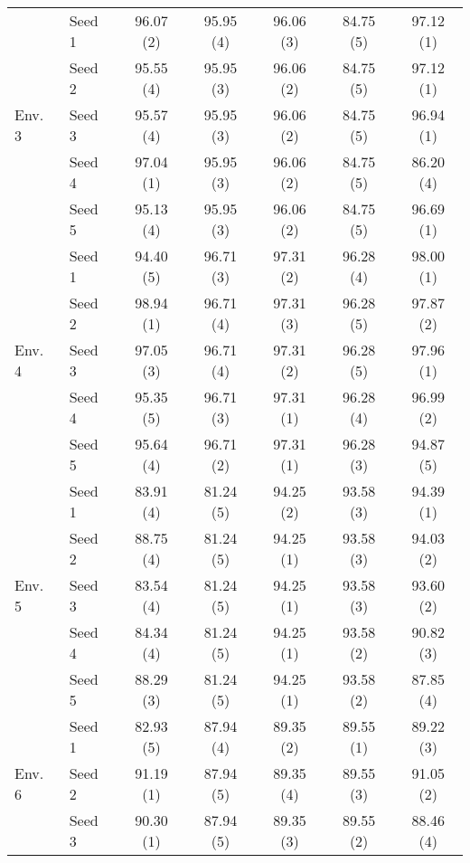 \begin{table}[t]
\begin{tabular}{l l c c c c c}
        \midrule
         \multirow{5}{*}{Env. 3} & Seed 1 & 96.07 (2) & 95.95 (4) & 96.06 (3) & 84.75 (5) & 97.12 (1)  \\
         \cmidrule{2-7}
         & Seed 2 & 95.55 (4) & 95.95 (3) & 96.06 (2) & 84.75 (5) & 97.12 (1)  \\
         \cmidrule{2-7}
         & Seed 3 & 95.57 (4) & 95.95 (3) & 96.06 (2) & 84.75 (5) & 96.94 (1)  \\
         \cmidrule{2-7}
         & Seed 4 & 97.04 (1) & 95.95 (3) & 96.06 (2) & 84.75 (5) & 86.20 (4)  \\
         \cmidrule{2-7}
         & Seed 5 & 95.13 (4) & 95.95 (3) & 96.06 (2) & 84.75 (5) & 96.69 (1)  \\
         \midrule 
         \multirow{5}{*}{Env. 4} & Seed 1 & 94.40 (5) & 96.71 (3) & 97.31 (2) & 96.28 (4) & 98.00 (1)   \\
         \cmidrule{2-7}
         & Seed 2 & 98.94 (1) & 96.71 (4) & 97.31 (3) & 96.28 (5) & 97.87 (2)   \\
         \cmidrule{2-7}
         & Seed 3 & 97.05 (3) & 96.71 (4) & 97.31 (2) & 96.28 (5) & 97.96 (1)   \\
         \cmidrule{2-7}
         & Seed 4 & 95.35 (5) & 96.71 (3) & 97.31 (1) & 96.28 (4) & 96.99 (2)  \\
         \cmidrule{2-7}
         & Seed 5 & 95.64 (4) & 96.71 (2) & 97.31 (1) & 96.28 (3) & 94.87 (5)  \\
         \midrule 
         \multirow{5}{*}{Env. 5} & Seed 1 & 83.91 (4) & 81.24 (5) & 94.25 (2) & 93.58 (3) & 94.39 (1) \\
         \cmidrule{2-7}
         & Seed 2 & 88.75 (4) & 81.24 (5) & 94.25 (1) & 93.58 (3) & 94.03 (2)   \\
         \cmidrule{2-7}
         & Seed 3 & 83.54 (4) & 81.24 (5) & 94.25 (1) & 93.58 (3) & 93.60 (2)   \\
         \cmidrule{2-7}
         & Seed 4 & 84.34 (4) & 81.24 (5) & 94.25 (1) & 93.58 (2) & 90.82 (3)  \\
         \cmidrule{2-7}
         & Seed 5 & 88.29 (3) & 81.24 (5) & 94.25 (1) & 93.58 (2) & 87.85 (4)  \\
         \midrule 
         \multirow{5}{*}{Env. 6} & Seed 1 & 82.93 (5) & 87.94 (4) & 89.35 (2) & 89.55 (1) & 89.22 (3)  \\
         \cmidrule{2-7}
         & Seed 2 & 91.19 (1) & 87.94 (5) & 89.35 (4) & 89.55 (3) & 91.05 (2)  \\
         \cmidrule{2-7}
         & Seed 3 & 90.30 (1) & 87.94 (5) & 89.35 (3) & 89.55 (2) & 88.46 (4)   \\

\end{tabular}
\end{table}
